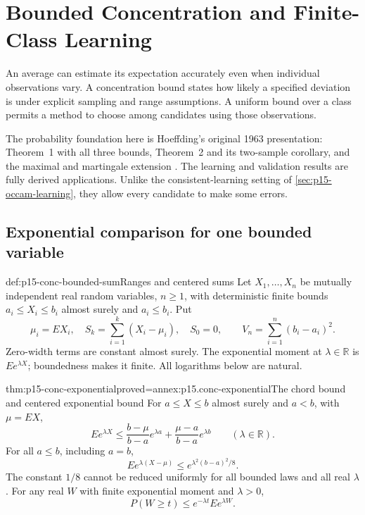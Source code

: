 \chapter{Bounded Concentration and Finite-Class Learning}
\label{sec:p15-bounded-concentration-learning}

An average can estimate its expectation accurately even when individual
observations vary. A concentration bound states how likely a specified
deviation is under explicit sampling and range assumptions. A uniform
bound over a class permits a method to choose among candidates using
those observations.

The probability foundation here is Hoeffding's original 1963 presentation:
Theorem~1 with all three bounds, Theorem~2 and its two-sample corollary,
and the maximal and martingale extension
\cite[pp.~13--18 and 20--23]{Hoeffding1963BoundedSums}.
The learning and validation results are fully derived applications.
Unlike the consistent-learning setting of \cref{sec:p15-occam-learning},
they allow every candidate to make some errors.

\section{Exponential comparison for one bounded variable}

\begin{hbdefinition}{def:p15-conc-bounded-sum}{Ranges and centered sums}
Let \(X_1,\ldots,X_n\) be mutually independent real random variables,
\(n\geq1\), with deterministic finite bounds
\(a_i\leq X_i\leq b_i\) almost surely and \(a_i\leq b_i\).
Put
\[
 \mu_i=EX_i,\quad S_k=\sum_{i=1}^k(X_i-\mu_i),\quad S_0=0,
 \qquad V_n=\sum_{i=1}^n(b_i-a_i)^2.
\]
Zero-width terms are constant almost surely.
The exponential moment at \(\lambda\in\mathbb R\) is
\(E e^{\lambda X}\); boundedness makes it finite.
All logarithms below are natural.
\end{hbdefinition}

\begin{hblemma}{thm:p15-conc-exponential}{proved=annex:p15.conc-exponential}{The chord bound and centered exponential bound}
For \(a\leq X\leq b\) almost surely and \(a<b\), with \(\mu=EX\),
\[
 E e^{\lambda X}
   \leq\frac{b-\mu}{b-a}e^{\lambda a}
          +\frac{\mu-a}{b-a}e^{\lambda b}
                  \qquad(\lambda\in\mathbb R).
\]
For all \(a\leq b\), including \(a=b\),
\[
                     E e^{\lambda(X-\mu)}
                        \leq e^{\lambda^2(b-a)^2/8}.
\]
The constant \(1/8\) cannot be reduced uniformly for all bounded
laws and all real \(\lambda\).
For any real \(W\) with finite exponential moment and
\(\lambda>0\),
\[
                         P(W\geq t)\leq e^{-\lambda t}Ee^{\lambda W}.
\]
\end{hblemma}

